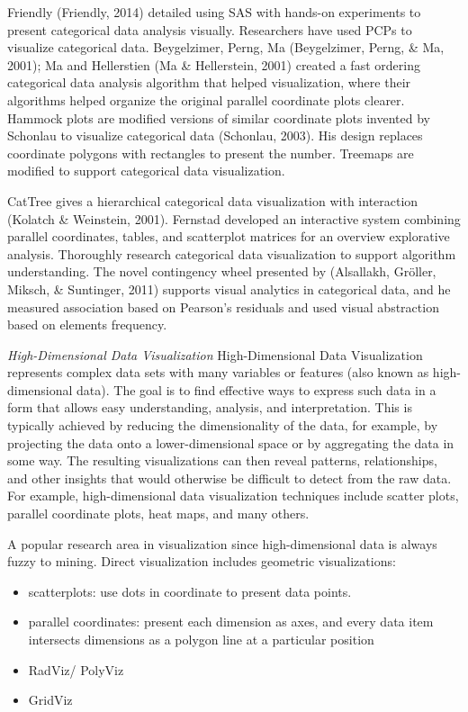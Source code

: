\documentclass[print]{nuthesis}
\providecommand{\tightlist}{%
  \setlength{\itemsep}{0pt}\setlength{\parskip}{0pt}}
\begin{document}
Friendly (Friendly, 2014) detailed using SAS with hands-on experiments to present categorical data analysis visually. Researchers have used PCPs to visualize categorical data. Beygelzimer, Perng, Ma (Beygelzimer, Perng, \& Ma, 2001); Ma and Hellerstien (Ma \& Hellerstein, 2001) created a fast ordering categorical data analysis algorithm that helped visualization, where their algorithms helped organize the original parallel coordinate plots clearer. Hammock plots are modified versions of similar coordinate plots invented by Schonlau to visualize categorical data (Schonlau, 2003). His design replaces coordinate polygons with rectangles to present the number. Treemaps are modified to support categorical data visualization.

CatTree gives a hierarchical categorical data visualization with interaction (Kolatch \& Weinstein, 2001). Fernstad developed an interactive system combining parallel coordinates, tables, and scatterplot matrices for an overview explorative analysis. Thoroughly research categorical data visualization to support algorithm understanding. The novel contingency wheel presented by (Alsallakh, Gröller, Miksch, \& Suntinger, 2011) supports visual analytics in categorical data, and he measured association based on Pearson's residuals and used visual abstraction based on elements frequency.

\emph{High-Dimensional Data Visualization}
High-Dimensional Data Visualization represents complex data sets with many variables or features (also known as high-dimensional data). The goal is to find effective ways to express such data in a form that allows easy understanding, analysis, and interpretation. This is typically achieved by reducing the dimensionality of the data, for example, by projecting the data onto a lower-dimensional space or by aggregating the data in some way. The resulting visualizations can then reveal patterns, relationships, and other insights that would otherwise be difficult to detect from the raw data. For example, high-dimensional data visualization techniques include scatter plots, parallel coordinate plots, heat maps, and many others.

A popular research area in visualization since high-dimensional data is always fuzzy to mining. Direct visualization includes geometric visualizations:

\begin{itemize}
\tightlist
\item
  scatterplots: use dots in coordinate to present data points.
\item
  parallel coordinates: present each dimension as axes, and every data item intersects dimensions as a polygon line at a particular position
\item
  RadViz/ PolyViz
\item
  GridViz
\end{itemize}
\end{document}

